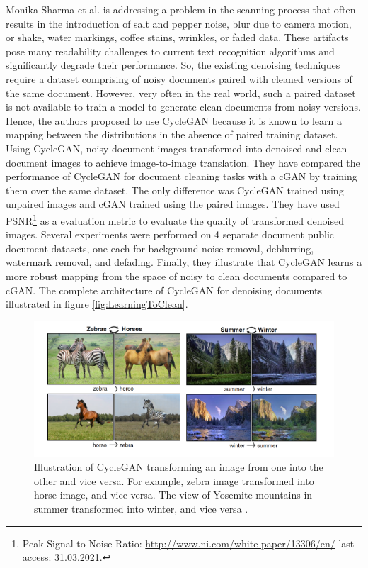 Monika Sharma et al.\cite{sharma2019learning} is addressing a problem in the scanning process that often results in the introduction of salt and pepper noise, blur due to camera motion, or shake, water markings, coffee stains, wrinkles, or faded data. These artifacts pose many readability challenges to current text recognition algorithms and significantly degrade their performance. So, the existing denoising techniques require a dataset comprising of noisy documents paired with cleaned versions of the same document. However, very often in the real world, such a paired dataset is not available to train a model to generate clean documents from noisy versions. Hence, the authors proposed to use \ac{CycleGAN} because it is known to learn a mapping between the distributions in the absence of paired training dataset. Using \ac{CycleGAN}, noisy document images transformed into denoised and clean document images to achieve image-to-image translation. They have compared the performance of \ac{CycleGAN} for document cleaning tasks with a \ac{cGAN} by training them over the same dataset. The only difference was \ac{CycleGAN} trained using unpaired images and \ac{cGAN} trained using the paired images. They have used \ac{PSNR}\footnote{Peak Signal-to-Noise Ratio: \url{http://www.ni.com/white-paper/13306/en/} last access: 31.03.2021.} as a evaluation metric to evaluate the quality of transformed denoised images. Several experiments were performed on 4 separate document public document datasets, one each for background noise removal, deblurring, watermark removal, and defading. Finally, they illustrate that \ac{CycleGAN} learns a more robust mapping from the space of noisy to clean documents compared to \ac{cGAN}. The complete architecture of \ac{CycleGAN} for denoising documents illustrated in figure \ref{fig:LearningToClean}.


\begin{figure}[H]
        \begin{center}
 	    \includegraphics[scale=0.35]{images/relatedWorks/CycleGANExamples.png}
	    \caption[Illustration of \ac{CycleGAN} transforming an image from one into the other and vice versa.]{Illustration of \ac{CycleGAN} transforming an image from one into the other and vice versa. For example, zebra image transformed into horse image, and vice versa. The view of Yosemite mountains in summer transformed into winter, and vice versa \cite{zhu2020unpaired}.}
	    \label{fig:CycleganExamples}
	    \end{center}
\end{figure}



